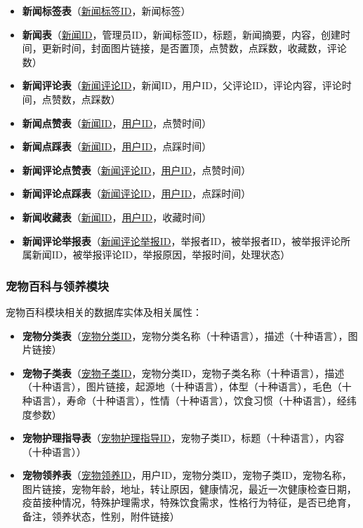 \begin{itemize}
    \item \textbf{新闻标签表}（\underline{新闻标签ID}，新闻标签）
    \item \textbf{新闻表}（\underline{新闻ID}，管理员ID，新闻标签ID，标题，新闻摘要，内容，创建时间，更新时间，封面图片链接，是否置顶，点赞数，点踩数，收藏数，评论数）
    \item \textbf{新闻评论表}（\underline{新闻评论ID}，新闻ID，用户ID，父评论ID，评论内容，评论时间，点赞数，点踩数）
    \item \textbf{新闻点赞表}（\underline{新闻ID}，\underline{用户ID}，点赞时间）
    \item \textbf{新闻点踩表}（\underline{新闻ID}，\underline{用户ID}，点踩时间）
    \item \textbf{新闻评论点赞表}（\underline{新闻评论ID}，\underline{用户ID}，点赞时间）
    \item \textbf{新闻评论点踩表}（\underline{新闻评论ID}，\underline{用户ID}，点踩时间）
    \item \textbf{新闻收藏表}（\underline{新闻ID}，\underline{用户ID}，收藏时间）
    \item \textbf{新闻评论举报表}（\underline{新闻评论举报ID}，举报者ID，被举报者ID，被举报评论所属新闻ID，被举报评论ID，举报原因，举报时间，处理状态）
\end{itemize}

\subsubsection{宠物百科与领养模块}

宠物百科模块相关的数据库实体及相关属性：

\begin{itemize}
    \item \textbf{宠物分类表}（\underline{宠物分类ID}，宠物分类名称（十种语言），描述（十种语言），图片链接）
    \item \textbf{宠物子类表}（\underline{宠物子类ID}，宠物分类ID，宠物子类名称（十种语言），描述（十种语言），图片链接，起源地（十种语言），体型（十种语言），毛色（十种语言），寿命（十种语言），性情（十种语言），饮食习惯（十种语言），经纬度参数）
    \item \textbf{宠物护理指导表}（\underline{宠物护理指导ID}，宠物子类ID，标题（十种语言），内容（十种语言））
    \item \textbf{宠物领养表}（\underline{宠物领养ID}，用户ID，宠物分类ID，宠物子类ID，宠物名称，图片链接，宠物年龄，地址，转让原因，健康情况，最近一次健康检查日期，疫苗接种情况，特殊护理需求，特殊饮食需求，性格行为特征，是否已绝育，备注，领养状态，性别，附件链接）
\end{itemize}


